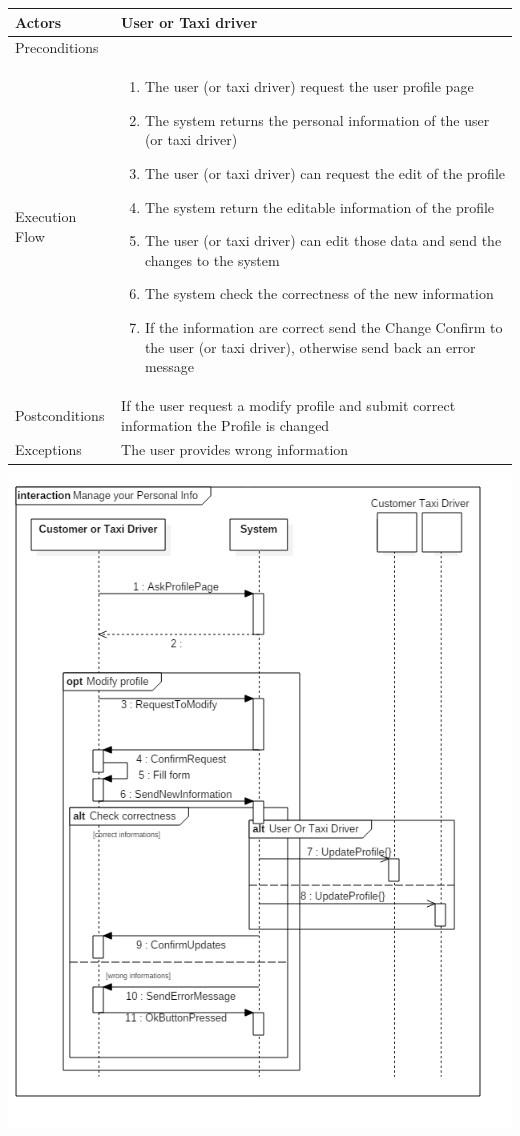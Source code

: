 \documentclass[english]{article}
\providecommand{\tabularnewline}{\\}
\begin{document}
\begin{tabular}{lp{8cm}}
\hline 
Actors  & User or Taxi driver \tabularnewline
\hline 
Preconditions  & \tabularnewline
\hline 
Execution Flow  & \begin{enumerate}
\item The user (or taxi driver) request the user profile page 
\item The system returns the personal information of the user (or taxi driver) 
\item The user (or taxi driver) can request the edit of the profile 
\item The system return the editable information of the profile 
\item The user (or taxi driver) can edit those data and send the changes
to the system 
\item The system check the correctness of the new information
\item If the information are correct send the Change Confirm to the user
(or taxi driver), otherwise send back an error message \end{enumerate}
\tabularnewline
\hline 
Postconditions  & If the user request a modify profile and submit correct information
the Profile is changed \tabularnewline
\hline 
Exceptions  & The user provides wrong information \tabularnewline
\end{tabular}

\includegraphics[width=\textwidth]{ManageInformation}
\end{document}
